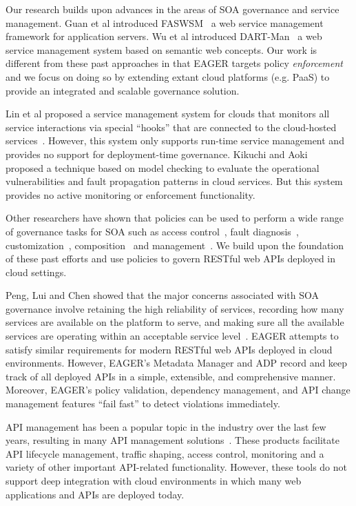Our research builds upon advances in the areas of SOA governance and
service management. 
Guan et al introduced FASWSM~\cite{1607141} a web service management
framework for application servers. Wu et al introduced DART-Man~\cite{1504267} a web
service management system based on semantic web concepts. 
Our work is different 
from these past approaches in that EAGER targets policy \textit{enforcement} 
and we focus on doing so by extending extant
cloud platforms (e.g. PaaS) to provide an integrated and scalable governance
solution.

Lin et al proposed a service management system for clouds that monitors all
service interactions via special ``hooks'' that are connected to the
cloud-hosted services~\cite{5616981}. However, this system only supports run-time
service management and provides no support for deployment-time governance. 
Kikuchi and Aoki~\cite{6525502} proposed a technique
based on model checking to evaluate the operational vulnerabilities and fault
propagation patterns in cloud services. But this system provides no
active monitoring or enforcement functionality.

Other researchers have shown that policies can be
used to perform a wide range of governance tasks for SOA such as access
control~\cite{4279630}, fault diagnosis~\cite{6154236},
customization~\cite{4027138},
composition~\cite{1592403,Erradi:2006:PMS:1515984.1515990} and
management~\cite{Suleiman:2009:IUM:1564601.1564730}. We build
upon the foundation of these past efforts and use policies to govern
RESTful web APIs deployed in cloud settings. 

Peng, Lui and Chen showed that
the major concerns associated with SOA governance 
involve retaining the high reliability of services, recording how many services
are available on the platform to serve, and making sure all the available 
services are operating within an acceptable service
level~\cite{4730489}. EAGER attempts to satisfy similar requirements for 
modern RESTful web APIs deployed in cloud environments. 
However, EAGER's Metadata Manager and ADP record and keep track of all deployed APIs 
in a simple, extensible, and comprehensive manner.  Moreover, EAGER's policy
validation, dependency management, and API change management features 
``fail fast'' to detect violations immediately.

API management has been a popular topic in the industry over the last few years, resulting
in many API management solutions~\cite{wso2am,apigee}. These products facilitate
API lifecycle management, traffic shaping, access control, monitoring and a variety of other
important API-related functionality. However, these tools do not support deep integration with
cloud environments in which many web applications and APIs are deployed today. 

